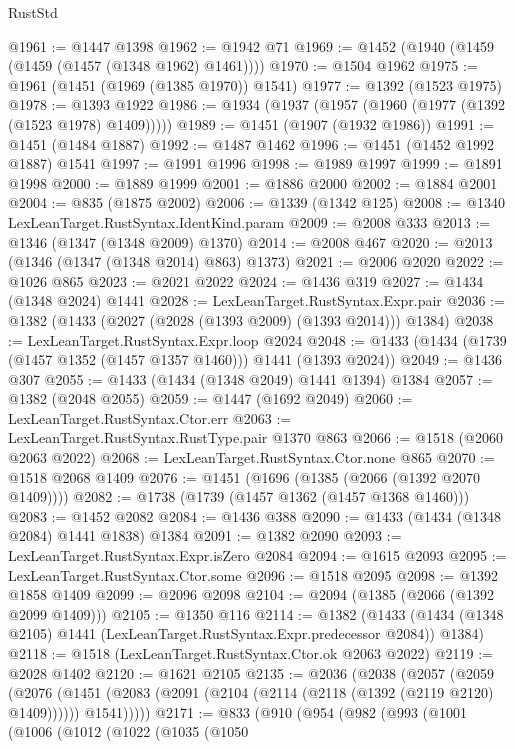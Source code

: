 \begin{lexlean}{RustStd}
\begin{coremodule}
@1961 := @1447 @1398
@1962 := @1942 @71
@1969 := @1452 (@1940 (@1459 (@1459 (@1457 (@1348 @1962) @1461))))
@1970 := @1504 @1962
@1975 := @1961 (@1451 (@1969 (@1385 @1970)) @1541)
@1977 := @1392 (@1523 @1975)
@1978 := @1393 @1922
@1986 := @1934 (@1937 (@1957 (@1960 (@1977 (@1392 (@1523 @1978) @1409)))))
@1989 := @1451 (@1907 (@1932 @1986))
@1991 := @1451 (@1484 @1887)
@1992 := @1487 @1462
@1996 := @1451 (@1452 @1992 @1887) @1541
@1997 := @1991 @1996
@1998 := @1989 @1997
@1999 := @1891 @1998
@2000 := @1889 @1999
@2001 := @1886 @2000
@2002 := @1884 @2001
@2004 := @835 (@1875 @2002)
@2006 := @1339 (@1342 @125)
@2008 := @1340 LexLeanTarget.RustSyntax.IdentKind.param
@2009 := @2008 @333
@2013 := @1346 (@1347 (@1348 @2009) @1370)
@2014 := @2008 @467
@2020 := @2013 (@1346 (@1347 (@1348 @2014) @863) @1373)
@2021 := @2006 @2020
@2022 := @1026 @865
@2023 := @2021 @2022
@2024 := @1436 @319
@2027 := @1434 (@1348 @2024) @1441
@2028 := LexLeanTarget.RustSyntax.Expr.pair
@2036 := @1382 (@1433 (@2027 (@2028 (@1393 @2009) (@1393 @2014))) @1384)
@2038 := LexLeanTarget.RustSyntax.Expr.loop @2024
@2048 := @1433 (@1434 (@1739 (@1457 @1352 (@1457 @1357 @1460))) @1441 (@1393 @2024))
@2049 := @1436 @307
@2055 := @1433 (@1434 (@1348 @2049) @1441 @1394) @1384
@2057 := @1382 (@2048 @2055)
@2059 := @1447 (@1692 @2049)
@2060 := LexLeanTarget.RustSyntax.Ctor.err
@2063 := LexLeanTarget.RustSyntax.RustType.pair @1370 @863
@2066 := @1518 (@2060 @2063 @2022)
@2068 := LexLeanTarget.RustSyntax.Ctor.none @865
@2070 := @1518 @2068 @1409
@2076 := @1451 (@1696 (@1385 (@2066 (@1392 @2070 @1409))))
@2082 := @1738 (@1739 (@1457 @1362 (@1457 @1368 @1460)))
@2083 := @1452 @2082
@2084 := @1436 @388
@2090 := @1433 (@1434 (@1348 @2084) @1441 @1838) @1384
@2091 := @1382 @2090
@2093 := LexLeanTarget.RustSyntax.Expr.isZero @2084
@2094 := @1615 @2093
@2095 := LexLeanTarget.RustSyntax.Ctor.some
@2096 := @1518 @2095
@2098 := @1392 @1858 @1409
@2099 := @2096 @2098
@2104 := @2094 (@1385 (@2066 (@1392 @2099 @1409)))
@2105 := @1350 @116
@2114 := @1382
    (@1433 (@1434 (@1348 @2105) @1441 (LexLeanTarget.RustSyntax.Expr.predecessor @2084)) @1384)
@2118 := @1518 (LexLeanTarget.RustSyntax.Ctor.ok @2063 @2022)
@2119 := @2028 @1402
@2120 := @1621 @2105
@2135 := @2036
    (@2038
      (@2057
        (@2059
          (@2076
            (@1451 (@2083 (@2091 (@2104 (@2114 (@2118 (@1392 (@2119 @2120) @1409)))))) @1541)))))
@2171 := @833
    (@910
      (@954
        (@982
          (@993
            (@1001
              (@1006
                (@1012
                  (@1022
                    (@1035
                      (@1050

\end{coremodule}
\end{lexlean}
